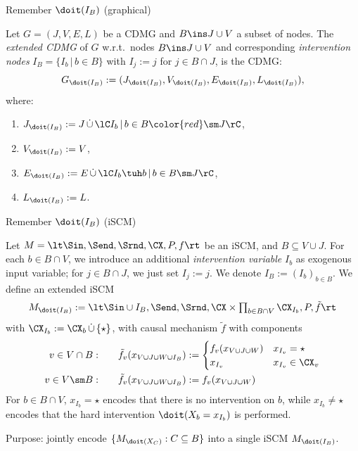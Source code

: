 \begin{frame}{Remember $\doit(I_B)$ (graphical)}
\begin{Def}[\ref{def:cdmg_intervention_nodes}]
  Let $G=(J,V,E,L)$ be a CDMG and $B \ins J \cup V$ a subset of nodes.
  The \emph{extended CDMG} of $G$ w.r.t.\ nodes $B \ins J \cup V$  and corresponding \emph{intervention nodes} 
  $I_B = \{I_b \,|\, b \in B\}$ {\color{red}with $I_j:=j$ for $j \in B \cap J$},
  is the CDMG: 
  \[ G_{\doit(I_B)}:=(J_{\doit(I_B)},V_{\doit(I_B)},E_{\doit(I_B)},L_{\doit(I_B)}),\]
  where:
  \begin{enumerate}
      \item $J_{\doit(I_B)}:= J\, \dot{\cup} \, \lC I_b\,|\, b \in B {\color{red}\sm J} \rC$, %
      \item $V_{\doit(I_B)}:= V$,
      \item $E_{\doit(I_B)}:= E\, \dot{\cup} \, \lC I_b \tuh b \,|\, b \in B\sm J \rC$,
      \item $L_{\doit(I_B)}:= L$.
  \end{enumerate}
\end{Def}
\end{frame}

\begin{frame}{Remember $\doit(I_B)$ (iSCM)}
  \begin{Def}[\ref{def:scm_intervention_variables}]
  Let $M = \lt \Sin, \Send, \Srnd, \CX, P, f \rt$ be an iSCM, and $B \subseteq V \cup J$.
    For each $b \in B \cap V$, we introduce an additional \emph{intervention variable} $I_b$ as exogenous input variable; \alert{for $j \in B \cap J$, we just set $I_j := j$}.
  We denote $I_B := (I_b)_{b \in B}$.
  We define an extended iSCM 
  \vskip-2mm
  $$\textstyle M_{\doit(I_B)} := \lt \Sin \cup I_B, \Send, \Srnd, \CX \times \prod_{b \in B \cap V} \CX_{I_b}, P, \tilde{f} \rt$$
  with $\CX_{I_b} := \CX_b \,\dot\cup\, \{\star\}$, with causal mechanism $\tilde{f}$ with components
  \vskip-6mm
  \begin{align*}
    v \in V \cap B: \qquad &\tilde{f}_v(x_{V \cup J \cup W \cup I_B}) := \begin{cases}
      f_v(x_{V \cup J \cup W}) & x_{I_v} = \star \\
      x_{I_v} & x_{I_v} \in \CX_v
    \end{cases}\\
    v \in V \sm B: \qquad & \tilde{f}_v(x_{V \cup J \cup W \cup I_B}) := f_v(x_{V \cup J \cup W})
  \end{align*}
  \vskip-2mm
  For $b \in B \cap V$, $x_{I_b} = \star$ encodes that there is no intervention on $b$, while $x_{I_b} \ne \star$ encodes that the hard intervention $\doit(X_b = x_{I_b})$ is performed.
\end{Def}
Purpose: jointly encode $\{M_{\doit(X_C)} : C \subseteq B\}$ into a single iSCM $M_{\doit(I_B)}$.
\end{frame}

